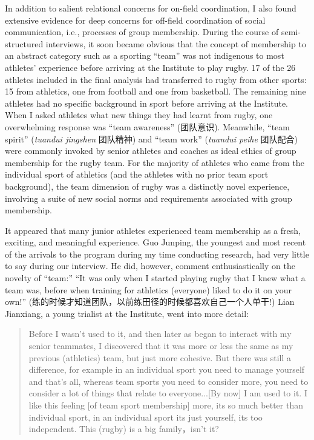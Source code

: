 \begin{CJK}{UTF8}{gbsn}
In addition to salient relational concerns for on-field coordination, I also found extensive evidence for deep concerns for off-field coordination of social communication, i.e., processes of group membership.  During the course of semi-structured interviews, it soon became obvious that the concept of membership to an abstract category such as a sporting ``team'' was not indigenous to most athletes' experience before arriving at the Institute to play rugby.  17 of the 26 athletes included in the final analysis had transferred to rugby from other sports: 15 from athletics, one from football and one from basketball.  The remaining nine athletes had no specific background in sport before arriving at the Institute.
When I asked athletes what new things they had learnt from rugby, one overwhelming response was ``team awareness'' (团队意识).
Meanwhile, ``team spirit'' (\textit{tuandui jingshen} 团队精神) and ``team work'' (\textit{tuandui peihe} 团队配合) were commonly invoked by senior athletes and coaches as ideal ethics of group membership for the rugby team. For the majority of athletes who came from the individual sport of athletics (and the athletes with no prior team sport background), the team dimension of rugby was a distinctly novel experience, involving a suite of new social norms and requirements associated with group membership.

It appeared that many junior athletes experienced team membership as a fresh, exciting, and meaningful experience.  Guo Junping, the youngest and most recent of the arrivals to the program during my time conducting research, had very little to say during our interview.  He did, however, comment enthusiastically on the novelty of ``team:'' ``It was only when I started playing rugby that I knew what a team was, before when training for athletics (everyone) liked to do it on your own!'' (练的时候才知道团队，以前练田径的时候都喜欢自己一个人单干!) Lian Jianxiang, a young trialist at the Institute, went into more detail:

  \begin{quote}
   Before I wasn't used to it, and then later as began to interact with my senior teammates, I discovered that it was more or less the same as my previous (athletics) team, but just more cohesive.  But there was still a difference, for example in an individual sport you need to manage yourself and that's all, whereas team sports you need to consider more, you need to consider a lot of things that relate to everyone...[By now] I am used to it. I like this feeling [of team sport membership] more, its so much better than individual sport, in an individual sport its just yourself, its too independent. This (rugby) is a big family，isn't it?
  \end{quote}


\end{CJK}
